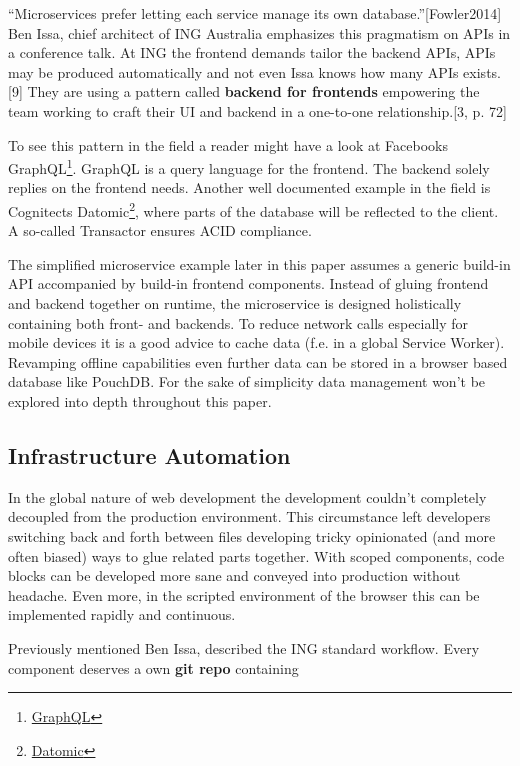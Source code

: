 \documentclass[]{article}
\begin{document}
``Microservices prefer letting each service manage its own
database.''{[}Fowler2014{]} Ben Issa, chief architect of ING Australia
emphasizes this pragmatism on APIs in a conference talk. At ING the
frontend demands tailor the backend APIs, APIs may be produced
automatically and not even Issa knows how many APIs exists.{[}9{]} They
are using a pattern called \textbf{backend for frontends} empowering the
team working to craft their UI and backend in a one-to-one
relationship.{[}3, p. 72{]}

To see this pattern in the field a reader might have a look at Facebooks
GraphQL\footnote{\href{http://graphql.org/}{GraphQL}}. GraphQL is a
query language for the frontend. The backend solely replies on the
frontend needs. Another well documented example in the field is
Cognitects Datomic\footnote{\href{http://www.datomic.com/}{Datomic}},
where parts of the database will be reflected to the client. A so-called
Transactor ensures ACID compliance.

The simplified microservice example later in this paper assumes a
generic build-in API accompanied by build-in frontend components.
Instead of gluing frontend and backend together on runtime, the
microservice is designed holistically containing both front- and
backends. To reduce network calls especially for mobile devices it is a
good advice to cache data (f.e. in a global Service Worker). Revamping
offline capabilities even further data can be stored in a browser based
database like PouchDB. For the sake of simplicity data management won't
be explored into depth throughout this paper.

\subsection{Infrastructure Automation}\label{infrastructure-automation}

In the global nature of web development the development couldn't
completely decoupled from the production environment. This circumstance
left developers switching back and forth between files developing tricky
opinionated (and more often biased) ways to glue related parts together.
With scoped components, code blocks can be developed more sane and
conveyed into production without headache. Even more, in the scripted
environment of the browser this can be implemented rapidly and
continuous.

Previously mentioned Ben Issa, described the ING standard workflow.
Every component deserves a own \textbf{git repo} containing
\end{document}
